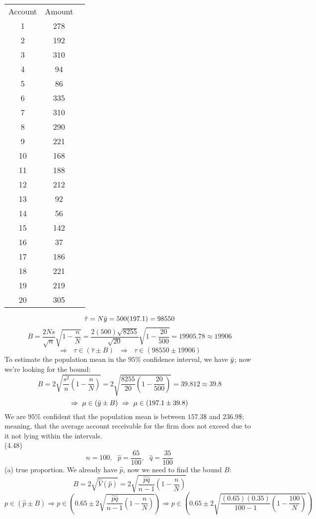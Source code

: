 \documentclass[11pt]{article}
\theoremstyle{claim}
\begin{document}
\begin{center}
\begin{tabular}{ c c c }
 Account & Amount\\
 1 & 278\\
 2 & 192\\
 3 & 310\\
 4 & 94\\
 5 & 86\\
 6 & 335\\
 7 & 310\\
 8 & 290\\
 9 & 221\\
 10 & 168\\
 11 & 188\\
 12 & 212\\
 13 & 92\\
 14 & 56\\
 15 & 142\\
 16 & 37\\
 17 & 186\\
 18 & 221\\
 19 & 219\\
 20 & 305
 
\end{tabular}
\end{center}
\vspace{5mm}
\[\hat{\tau}=N\Bar{y}=500(197.1)=98550\]
\[B=\frac{2Ns}{\sqrt{n}}\sqrt{1-\frac{n}{N}}=\frac{2(500)\sqrt{8255}}{\sqrt{20}}\sqrt{1-\frac{20}{500}}=19905.78\approx 19906\]
\[\Rightarrow \text{ } \tau \in (\hat{\tau}\pm B) \text{ } \Rightarrow \text{ } \tau \in (98550 \pm 19906)\]
To estimate the population mean in the $95\%$ confidence interval, we have $\Bar{y}$; now we're looking for the bound:
\[B=2\sqrt{\frac{s^2}{n}(1-\frac{n}{N})}=2\sqrt{\frac{8255}{20}(1-\frac{20}{500})}=39.812\approx 39.8\]
\[\Rightarrow \text{ } \mu\in(\Bar{y}\pm B) \text{ } \Rightarrow \text{ } \mu\in(197.1\pm 39.8)\]
We are $95\%$ confident that the population mean is between $157.3\$$ and $236.9\$$; meaning, that the average account receivable for the firm does not exceed due to it not lying within the intervals. 
\vspace{10mm}
\\(4.48)
\[n=100, \text{ } \hat{p}=\frac{65}{100}, \text{ } \hat{q}=\frac{35}{100}\]
(a) true proportion. We already have $\hat{p}$, now we need to find the bound $B$:
\[B=2\sqrt{\hat{V}(\hat{p})}=2\sqrt{\frac{\hat{p}\hat{q}}{n-1}(1-\frac{n}{N})}\]
\[p\in(\hat{p}\pm B) \Rightarrow p\in(0.65\pm 2\sqrt{\frac{\hat{p}\hat{q}}{n-1}(1-\frac{n}{N})})\Rightarrow p\in(0.65\pm 2\sqrt{\frac{(0.65)(0.35)}{100-1}(1-\frac{100}{N})})\]
\end{document}
